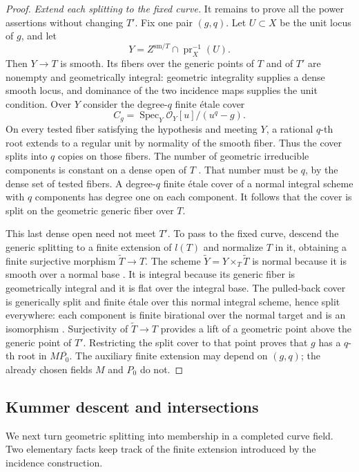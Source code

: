 \begin{proof}
\emph{Extend each splitting to the fixed curve.}
It remains to prove all the power assertions without changing $T'$.
Fix one pair $(g,q)$. Let $U\subset X$ be the unit locus of $g$, and let
\[
 Y=Z^{\mathrm{sm}/T}\cap\operatorname{pr}_X^{-1}(U).
\]
Then $Y\to T$ is smooth. Its fibers over the generic points of $T$
and of $T'$ are nonempty and geometrically integral: geometric
integrality supplies a dense smooth locus, and dominance of the two
incidence maps supplies the unit condition. Over $Y$ consider the
degree-$q$ finite \'etale cover
\[
 C_g=\operatorname{Spec}_Y\mathcal O_Y[u]/(u^q-g).
\]
On every tested fiber satisfying the hypothesis and meeting $Y$, a
rational $q$-th root extends to a regular unit by normality of the
smooth fiber. Thus the cover splits into $q$ copies on those fibers.
The number of geometric irreducible components is constant on a dense
open of $T$ \cite[Tag 055A]{Stacks}. That number must be $q$, by the
dense set of tested fibers. A degree-$q$ finite \'etale cover of a
normal integral scheme with $q$ components has degree one on each component.
It follows that the cover is split on the geometric generic fiber
over $T$.

This last dense open need not meet $T'$. To pass to the fixed curve,
descend the generic splitting to a finite extension of $l(T)$ and
normalize $T$ in it, obtaining a finite surjective morphism
$\widetilde T\to T$. The scheme
$\widetilde Y=Y\times_T\widetilde T$ is normal because it is smooth
over a normal base \cite[Tag 034F]{Stacks}. It is integral because its
generic fiber is geometrically integral and it is flat over the
integral base. The pulled-back cover is generically split and finite
\'etale over this normal integral scheme, hence split everywhere:
each component is finite birational over the normal target and is an
isomorphism \cite[Lemma 58.11.2, Tag 0BQL]{Stacks}.
Surjectivity of $\widetilde T\to T$ provides a lift of a geometric
point above the generic point of $T'$. Restricting the split cover to
that point proves that $g$ has a $q$-th root in
$M\overline{P_0}$. The auxiliary finite extension may depend on
$(g,q)$; the already chosen fields $M$ and $P_0$ do not.
\end{proof}

\subsection{Kummer descent and intersections}

We next turn geometric splitting into membership in a completed curve
field. Two elementary facts keep track of the finite extension
introduced by the incidence construction.

